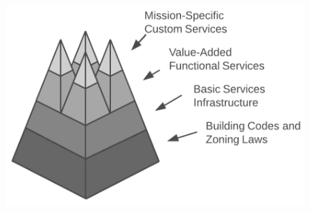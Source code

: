 \documentclass{../cscslides}
\begin{document}
\begin{frame}
\begin{columns}
\begin{column}{0.4\textwidth}
\begin{center}
                    \includegraphics[width=\textwidth]{noIslandOfAutomation.png}
                \end{center}	
            \end{column}
        \end{columns}
    \end{frame}
\end{document}
